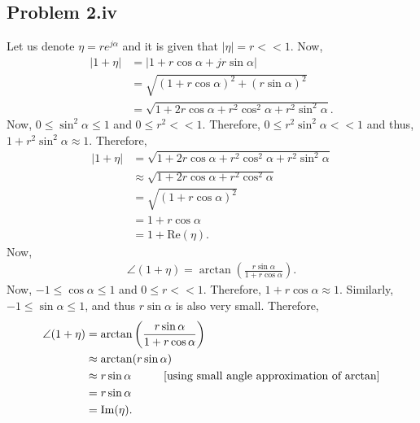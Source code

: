 \subsection*{Problem 2.iv}
Let us denote $\eta = re^{j\alpha}$ and it is given that $|\eta| = r << 1$. Now,
\begin{align*}
	|1+\eta| &= |1+r\cos\alpha + j r\sin \alpha|\\
	&= \sqrt{(1+r\cos\alpha)^2+(r\sin\alpha)^2}\\
	&= \sqrt{1+2r\cos\alpha + r^2\cos^2\alpha + r^2\sin^2\alpha}.
\end{align*}
Now, $0 \leq \sin^2\alpha \leq 1$ and $0 \leq r^2 << 1$. Therefore, $0 \leq r^2\sin^2\alpha << 1$ and thus, $1+r^2\sin^2\alpha \approx 1$. Therefore,
\begin{align*}
	|1+\eta| &= \sqrt{1+2r\cos\alpha + r^2\cos^2\alpha + r^2\sin^2\alpha}\\
	&\approx \sqrt{1+2r\cos\alpha + r^2\cos^2\alpha}\\
	&= \sqrt{(1+r\cos\alpha)^2}\\
	&= 1+r\cos\alpha\\
	&= 1+\text{Re}(\eta).
\end{align*}
Now,
\begin{align*}
	\angle(1+\eta) = \arctan\left(\frac{r\sin\alpha}{1+r\cos\alpha}\right).
\end{align*}
Now, $-1 \leq \cos\alpha \leq 1$ and $0 \leq r << 1$. Therefore, $1+ r\cos\alpha \approx 1$. Similarly, $-1 \leq \sin\alpha \leq 1$, and thus $r\sin\alpha$ is also very small. Therefore,
\begin{align*}
	\angle(1+\eta) &= \arctan\left(\frac{r\sin\alpha}{1+r\cos\alpha}\right)\\
	&\approx \arctan(r\sin\alpha)\\
	& \approx r\sin\alpha \hspace*{1cm}[\text{using small angle approximation of arctan}]\\
	&= r\sin\alpha\\
	&= \text{Im}(\eta).
\end{align*}
